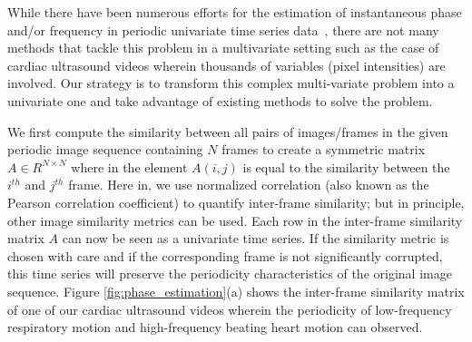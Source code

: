 \documentclass[runningheads,a4paper]{llncs}
\begin{document}
%
While there have been numerous efforts for the estimation of instantaneous phase and/or frequency in periodic univariate time series data~\cite{Boashash1992}, there are not many methods that tackle this problem in a multivariate setting such as the case of cardiac ultrasound videos wherein thousands of variables (pixel intensities) are involved. Our strategy is to transform this complex multi-variate problem into a univariate one and take advantage of existing methods to solve the problem. 

	We first compute the similarity between all pairs of images/frames in the given periodic image sequence containing $N$ frames to create a symmetric matrix $A \in R^{N \times N}$ where in the element $A(i,j)$ is equal to the similarity between the $i^{th}$ and $j^{th}$ frame. Here in, we use normalized correlation (also known as the Pearson correlation coefficient) to quantify inter-frame similarity; but in principle, other image similarity metrics can be used. Each row in the inter-frame similarity matrix $A$ can now be seen as a univariate time series. If the similarity metric is chosen with care and if the corresponding frame is not significantly corrupted, this time series will preserve the periodicity characteristics of the original image sequence. Figure \ref{fig:phase_estimation}(a) shows the inter-frame similarity matrix of one of our cardiac ultrasound videos wherein the periodicity of low-frequency respiratory motion and high-frequency beating heart motion can observed. 
\end{document}

